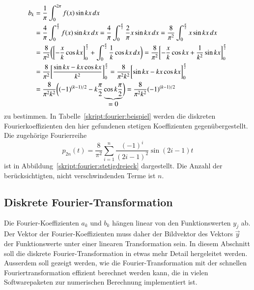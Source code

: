 \begin{align}
b_k
&=
\frac{1}{\pi} \int_0^{2\pi} f(x) \sin kx\,dx
\notag
\\
&=
\frac{4}{\pi} \int_{0}^{\frac{\pi}2} f(x)\sin kx\,dx
=
\frac{4}{\pi} \int_{0}^{\frac{\pi}2} \frac2{\pi}x\sin kx\,dx
=
\frac{8}{\pi^2} \int_{0}^{\frac{\pi}2} x\sin kx\,dx
\notag
\\
&=
\frac{8}{\pi^2} \biggl(
\biggl[-\frac{x}{k}\cos kx\biggr]_0^{\frac{\pi}2} + \int_{0}^{\frac{\pi}2}\frac{1}{k}\cos kx\,dx
\biggr)
=
\frac{8}{\pi^2}
\biggl[
-\frac{x}{k}\cos kx +\frac{1}{k^2}\sin kx
\biggr]_0^{\frac{\pi}2}
\notag
\\
&=
\frac{8}{\pi^2} \biggl[ \frac{\sin kx - kx\cos kx}{k^2}\biggr]_0^{\frac{\pi}2}
=
\frac{8}{\pi^2 k^2} \biggl[\sin kx - kx\cos kx\biggr]_0^{\frac{\pi}2}
\notag
\\
&=
\frac{8}{\pi^2k^2}\biggl(
(-1)^{(k-1)/2} - k\frac{\pi}2\underbrace{\cos k\frac{\pi}2}_{\displaystyle=0}
\biggr)
=
\frac{8}{\pi^2k^2}(-1)^{(k-1)/2}
\label{skript:fourier:bkstetig}
\end{align}
zu bestimmen.
In Tabelle~\ref{skript:fourier:beispiel} werden die diskreten
Fourierkoeffizienten den hier gefundenen stetigen Koeffizienten
gegenübergestellt.
Die zugehörige Fourierreihe
\begin{equation}
p_{2n}(t) = \frac{8}{\pi^2} \sum_{i=1}^n \frac{(-1)^i}{(2i-1)^2}\sin(2i-1)t
\label{skript:fourier:dreieckreihe}
\end{equation}
ist in Abbildung~\ref{skript:fourier:stetigdreieck} dargestellt.
Die Anzahl der berücksichtigten, nicht verschwindenden Terme ist $n$.

\subsection{Diskrete Fourier-Transformation}
Die Fourier-Koeffizienten $a_k$ und $b_k$ hängen linear von den
Funktionswerten $y_j$ ab.
Der Vektor der Fourier-Koeffizienten muss daher der Bildvektor des
Vektors $\vec y$ der Funktionswerte unter einer linearen Transformation
sein.
In diesem Abschnitt soll die diskrete Fourier-Transformation in etwas
mehr Detail hergeleitet werden.
Ausserdem soll gezeigt werden, wie die Fourier-Transformation
mit der schnellen Fouriertransformation
effizient berechnet werden kann, die in vielen Softwarepaketen zur
numerischen Berechnung implementiert ist.

